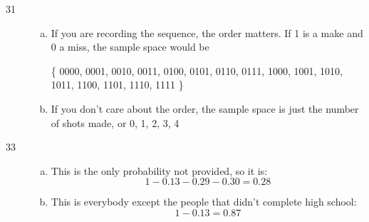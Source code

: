 \documentclass[letterpaper, landscape]{exam}
\begin{document}
    \begin{description}

      \item[31] 
        \begin{enumerate}[(a)]
          \item If you are recording the sequence, the order matters.  If 1 is a
            make and 0 a miss, the sample space would be 
            
            \{ 0000, 0001, 0010, 0011, 0100, 0101, 0110, 0111, 1000, 1001, 1010,
               1011, 1100, 1101, 1110, 1111 \}

          \item If you don't care about the order, the sample space is just the
            number of shots made, or {0, 1, 2, 3, 4 }

        \end{enumerate}




      \item[33]
        \begin{enumerate}[(a)]
          \item This is the only probability not provided, so it is:
            \[
              1 - 0.13 - 0.29 - 0.30 = \boxed{ 0.28 }
            \]

          \item This is everybody except the people that didn't complete high
            school:
            \[
              1 - 0.13 = \boxed{ 0.87 }
            \]
        \end{enumerate}


\end{description}
\end{document}
